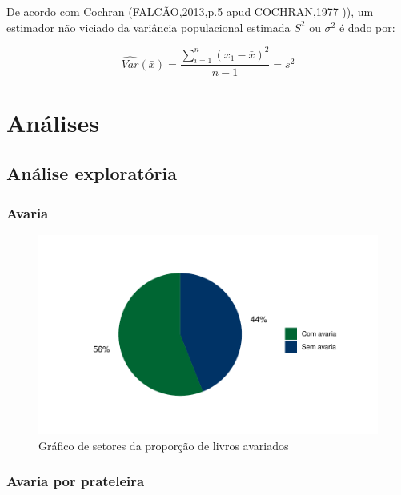 \documentclass[a4paper, 12pt]{article}
\begin{document}
De acordo com Cochran (FALCÃO,2013,p.5 \cite{joao} apud COCHRAN,1977 \cite{cochran1977sampling})), um estimador não viciado da variância populacional estimada $S^2$ ou $\sigma^2$ é dado por:

$$\widehat{Var}(\bar{x})=\frac{\sum^n_{i=1}(x_1-\bar{x})^2}{n-1}=s^2$$

\newpage

\section{Análises}

\subsection{Análise exploratória}

\subsubsection{Avaria}

\begin{figure}[H]
    \centering
    \caption{Gráfico de setores da proporção de livros avariados}
    \includegraphics[scale=1]{grafico2.pdf}
\end{figure}

\newpage

\subsubsection{Avaria por prateleira}
\end{document}
